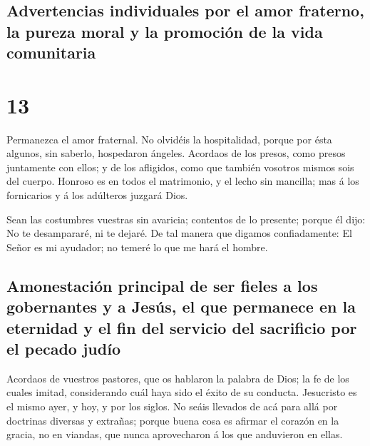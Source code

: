 \hypertarget{advertencias-individuales-por-el-amor-fraterno-la-pureza-moral-y-la-promociuxf3n-de-la-vida-comunitaria}{%
\subsection{Advertencias individuales por el amor fraterno, la pureza
moral y la promoción de la vida
comunitaria}\label{advertencias-individuales-por-el-amor-fraterno-la-pureza-moral-y-la-promociuxf3n-de-la-vida-comunitaria}}

\hypertarget{section-12}{%
\section{13}\label{section-12}}

 Permanezca el amor fraternal.  No olvidéis
la hospitalidad, porque por ésta algunos, sin saberlo, hospedaron
ángeles.  Acordaos de los presos, como presos juntamente
con ellos; y de los afligidos, como que también vosotros mismos sois del
cuerpo.  Honroso es en todos el matrimonio, y el lecho sin
mancilla; mas á los fornicarios y á los adúlteros juzgará Dios.

 Sean las costumbres vuestras sin avaricia; contentos de
lo presente; porque él dijo: No te desampararé, ni te dejaré.
 De tal manera que digamos confiadamente: El Señor es mi
ayudador; no temeré lo que me hará el hombre.

\hypertarget{amonestaciuxf3n-principal-de-ser-fieles-a-los-gobernantes-y-a-jesuxfas-el-que-permanece-en-la-eternidad-y-el-fin-del-servicio-del-sacrificio-por-el-pecado-juduxedo}{%
\subsection{Amonestación principal de ser fieles a los gobernantes y a
Jesús, el que permanece en la eternidad y el fin del servicio del
sacrificio por el pecado
judío}\label{amonestaciuxf3n-principal-de-ser-fieles-a-los-gobernantes-y-a-jesuxfas-el-que-permanece-en-la-eternidad-y-el-fin-del-servicio-del-sacrificio-por-el-pecado-juduxedo}}

 Acordaos de vuestros pastores, que os hablaron la palabra
de Dios; la fe de los cuales imitad, considerando cuál haya sido el
éxito de su conducta.  Jesucristo es el mismo ayer, y hoy,
y por los siglos.  No seáis llevados de acá para allá por
doctrinas diversas y extrañas; porque buena cosa es afirmar el corazón
en la gracia, no en viandas, que nunca aprovecharon á los que anduvieron
en ellas.

